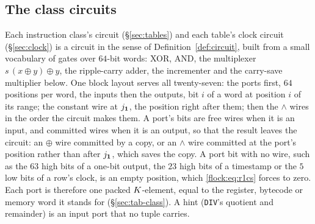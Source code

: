 \subsection{The class circuits}\label{flock:classes}

Each instruction class's circuit (\S\ref{sec:tables}) and each table's clock circuit (\S\ref{sec:clock}) is a circuit in the sense of Definition~\ref{def:circuit}, built from a small vocabulary of gates over $64$-bit words: XOR, AND, the multiplexer $s\,(x\oplus y)\oplus y$, the ripple-carry adder, the incrementer and the carry-save multiplier below. One block layout serves all twenty-seven: the ports first, $64$ positions per word, the inputs then the outputs, bit $i$ of a word at position $i$ of its range; the constant wire at $j_{\mathbf{1}}$, the position right after them; then the $\wedge$ wires in the order the circuit makes them. A port's bits are free wires when it is an input, and committed wires when it is an output, so that the result leaves the circuit: an $\oplus$ wire committed by a copy, or an $\wedge$ wire committed at the port's position rather than after $j_{\mathbf{1}}$, which saves the copy. A port bit with no wire, such as the $63$ high bits of a one-bit output, the $23$ high bits of a timestamp or the $5$ low bits of a row's clock, is an empty position, which \eqref{flock:eq:r1cs} forces to zero. Each port is therefore one packed $K$-element, equal to the register, bytecode or memory word it stands for (\S\ref{sec:tab-class}). A hint (\texttt{DIV}'s quotient and remainder) is an input port that no tuple carries.
